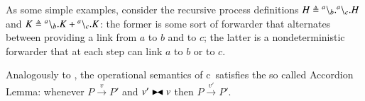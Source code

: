 \begin{example}
As some simple examples, consider the recursive process definitions $H \triangleq {}^{a} \backslash_{b}.{}^{a} \backslash_{c}.H$ and $K \triangleq {}^{a} \backslash_{b}.K + {}^{a} \backslash_{c}.K$: the former is some sort of forwarder that alternates between providing a link from $a$ to $b$ and to $c$; the latter is a nondeterministic forwarder that at each step can link $a$ to $b$ or to $c$. 
\end{example}

Analogously to \CNA, the operational semantics of c\CNA\ satisfies the so called Accordion Lemma: whenever $P \xrightarrow{v} P'$ and $v'\blackstretcheq v$ then $P \xrightarrow{v'} P'$.


